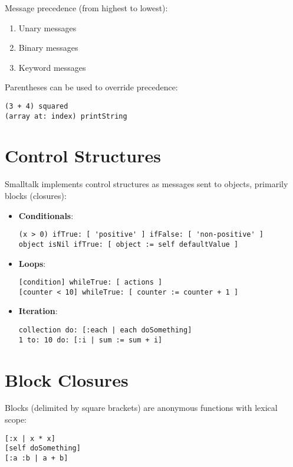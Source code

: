 \documentclass[12pt,a4paper]{report}
\begin{document}
Message precedence (from highest to lowest):
\begin{enumerate}
    \item Unary messages
    \item Binary messages
    \item Keyword messages
\end{enumerate}

Parentheses can be used to override precedence:
\begin{lstlisting}[style=smalltalk]
(3 + 4) squared
(array at: index) printString
\end{lstlisting}

\section{Control Structures}

Smalltalk implements control structures as messages sent to objects, primarily blocks (closures):

\begin{itemize}
    \item \textbf{Conditionals}:
    \begin{lstlisting}[style=smalltalk]
(x > 0) ifTrue: [ 'positive' ] ifFalse: [ 'non-positive' ]
object isNil ifTrue: [ object := self defaultValue ]
\end{lstlisting}

    \item \textbf{Loops}:
    \begin{lstlisting}[style=smalltalk]
[condition] whileTrue: [ actions ]
[counter < 10] whileTrue: [ counter := counter + 1 ]
\end{lstlisting}

    \item \textbf{Iteration}:
    \begin{lstlisting}[style=smalltalk]
collection do: [:each | each doSomething]
1 to: 10 do: [:i | sum := sum + i]
\end{lstlisting}
\end{itemize}

\section{Block Closures}

Blocks (delimited by square brackets) are anonymous functions with lexical scope:

\begin{lstlisting}[style=smalltalk]
[:x | x * x]
[self doSomething]
[:a :b | a + b]
\end{lstlisting}
\end{document}
